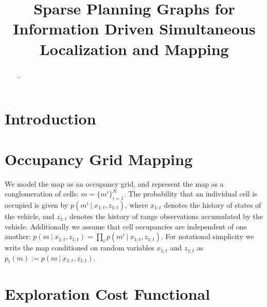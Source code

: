 \documentclass[conference]{IEEEtran}
\begin{document}
\title{Sparse Planning Graphs for Information Driven Simultaneous Localization and Mapping}
\author{
  }

\maketitle

\begin{abstract}
  \boldmath
  \dots
\end{abstract}

\IEEEpeerreviewmaketitle

\section{Introduction}
\label{section:introduction}

\section{Occupancy Grid Mapping}
\label{section:occupancy_grid_mapping}

We model the map as an occupancy grid, and represent the map as a conglomeration of cells: $m = \{m^{i}\}_{i=1}^{N}$. The probability that an individual cell is occupied is given by $p\left(m^{i} \ \vert \ x_{1:t}, z_{1:t}\right)$, where $x_{1:t}$ denotes the history of states of the vehicle, and $z_{1:t}$ denotes the history of range observations accumulated by the vehicle. Additionally we assume that cell occupancies  are independent of one another: $p\left(m \ \vert \ x_{1:t}, z_{1:t}\right) = \prod_{i} p\left(m^{i} \ \vert \ x_{1:t}, z_{1:t}\right)$. For notational simplicity we write the map conditioned on random variables $x_{1:t}$ and $z_{1:t}$ as $p_{t}\left(m\right) := p\left(m \ \vert \ x_{1:t}, z_{1:t}\right)$.

\section{Exploration Cost Functional}
\label{section:exploration_cost_functional}
\end{document}
